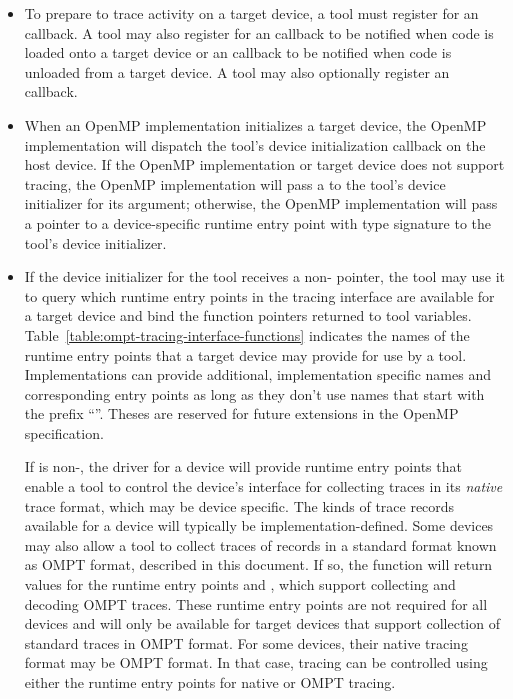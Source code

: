 \begin{itemize}
\item To prepare to trace activity on a target device, a tool must register for an
   callback.  A tool may also register for an 
   callback to be notified when code is loaded onto a target device or
an  callback to be notified when code is unloaded from a target device. 
A tool may also optionally register an  callback.
\item When an OpenMP implementation initializes a target device, the
  OpenMP implementation will dispatch the tool's device initialization
  callback on the host device. If the OpenMP implementation or target device does not support tracing, 
  the OpenMP implementation will pass a  to the tool's device initializer for its
   argument; otherwise, the OpenMP implementation will pass 
  a pointer to a device-specific runtime entry point with type 
  signature  to the tool's device initializer. 
\item If the device initializer for the tool receives a
  non-  pointer, the tool may use it to query
  which runtime entry points in the tracing interface are available for a target device
  and bind the function pointers returned to tool variables.
  Table~\ref{table:ompt-tracing-interface-functions} indicates the
  names of the runtime entry points that a target device may provide for use
  by a tool.  
  Implementations
can provide additional, implementation specific names and corresponding
entry points as long as they don't use names that start with the prefix
``''. Theses are reserved for future extensions in the 
OpenMP specification.

  If  is non-, the driver for a device will
  provide runtime entry points that enable a tool to control the device's
  interface for collecting traces in its \emph{native} trace format,
  which may be device specific.  
  The kinds of trace records available for a device will typically be
  implementation-defined.
  Some devices may also allow a tool to
  collect traces of records in a standard format known as OMPT format,
  described in this document. If so, the  function will
  return values for the runtime entry points 
   and , which support
  collecting and decoding OMPT traces. 
  These runtime entry points are not required for all devices and will only be available for target devices that support 
  collection of standard traces in OMPT format.
  For some devices, their native
  tracing format may be OMPT format. In that case, tracing can be
  controlled using either the runtime entry points for native or OMPT
  tracing.


\end{itemize}
